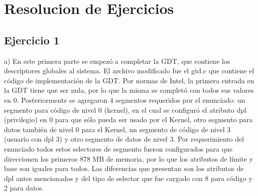 \documentclass[a4paper]{article}
\begin{document}
\thispagestyle{empty}
\maketitle





\thispagestyle{empty}
\vspace{3cm}
\tableofcontents
\newpage


\newpage



\section{Resolucion de Ejercicios}
\subsection{Ejercicio 1}
a) En este primera parte se empezó a completar la GDT, que contiene los descriptores globales al sistema. El archivo modificado fue el gtd.c que contiene el código de implementación de la GDT. Por normas de Intel, la primera entrada en la GDT tiene que ser nula, por lo que la misma se completó con todos sus valores en 0. Posteriormente se agregaron 4 segmentos requeridos por el enunciado: un segmento para código de nivel 0 (kernel), en el cual se configuró el atributo dpl (privilegio) en 0 para que sólo pueda ser usado por el Kernel, otro segmento para datos también de nivel 0 para el Kernel, un segmento de código de nivel 3 (usuario con dpl 3) y otro segmento de datos de nivel 3. Por requerimiento del enunciado todos estos selectores de segmento fueron configurados para que direccionen los primeros 878 MB de memoria, por lo que los atributos de límite y base son iguales para todos. Las diferencias que presentan son los atributos de dpl antes mencionados y del tipo de selector que fue cargado con 8 para código y 2 para datos.
\end{document}
